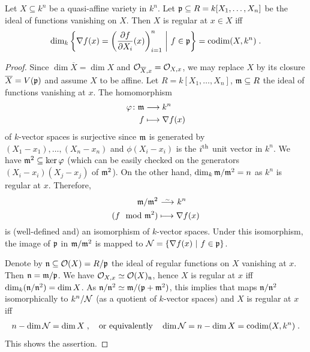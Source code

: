 \documentclass[a4paper,parskip=half,numbers=enddot, DIV=12]{scrreprt}
\begin{document}
\begin{prop}
    Let $X\subseteq k^n$ be  a quasi-affine variety in $k^n$. Let $\mathfrak{p}\subseteq R=k[X_1,\ldots,X_n]$ be the ideal of functions vanishing on $X$. Then $X$ is regular at $x\in X$ iff 
    \begin{align*}
        \dim_k \left\{\nabla f(x) = \left(\frac{\partial f}{\partial X_i}(x)\right)_{i=1}^n \ \middle|\  f\in \mathfrak{p}\right\} = \operatorname{codim}(X,k^n)\;.
    \end{align*}
\end{prop}
\begin{proof}
    Since $\dim \overline{X} = \dim X$ and $\mathcal{O}_{\overline{X},x} = \mathcal{O}_{X,x}$, we may replace $X$ by its closure $\overline{X}=V(\mathfrak{p})$ and assume $X$ to be affine. Let $R=k[X_1,\ldots,X_n]$, $\mathfrak{m}\subseteq R$ the ideal of functions vanishing at $x$. The homomorphism
    \begin{align*}
    	\phi\colon\mm&\morphism k^n\\
    	f&\longmapsto\nabla f(x)
    \end{align*}
    of $k$-vector spaces is surjective since $\mathfrak{m}$ is generated by $(X_1-x_1),\ldots,(X_n-x_n)$ and $\phi(X_i-x_i)$ is the $i^{\text{th}}$ unit vector in $k^n$. We have $\mathfrak{m}^2\subseteq\ker\varphi$ (which can be easily checked on the generators $(X_i-x_i)(X_j-x_j)$ of $\mathfrak{m}^2$). On the other hand, $\dim_k\mathfrak{m}/\mathfrak{m}^2=n$ as $k^n$ is regular at $x$. Therefore,
    \begin{align}\lbl{eq:modToNabla}
	    \begin{split}
		    \mm/\mm^2 &\isomorphism k^n\\
		    (f\mod \mm^2)&\longmapsto \nabla f(x)
	    \end{split}
    \end{align}
    is (well-defined and) an isomorphism of $k$-vector spaces. Under this isomorphism, the image of $\mathfrak{p}$ in $\mathfrak{m}/\mathfrak{m}^2$ is mapped to $\mathcal{N}=\left\{\nabla f(x) \ \middle|\  f\in \mathfrak{p}\right\}$.
    
     Denote by $\mathfrak{n}\subseteq \mathcal{O}(X)=R/\mathfrak{p}$ the ideal of regular functions on $X$ vanishing at $x$. Then $\mathfrak{n} = \mathfrak{m}/\mathfrak{p}$. We have $\mathcal{O}_{X,x} \simeq \mathcal{O}(X)_{\mathfrak{n}}$, hence $X$ is regular at $x$ iff $\dim_k(\mathfrak{n}/\mathfrak{n}^2) = \dim X$. As $\mathfrak{n}/\mathfrak{n}^2\simeq \mathfrak{m}/(\mathfrak{p}+\mathfrak{m}^2)$, this implies that  maps $\mathfrak{n}/\mathfrak{n}^2$ isomorphically to $k^n/\mathcal{N}$ (as a quotient of $k$-vector spaces) and $X$ is regular at $x$ iff 
     \begin{align*}
     	n-\dim\mathcal{N} = \dim X\;,\quad\text{or equivalently}\quad\dim \mathcal{N} =n-\dim X = \operatorname{codim}(X,k^n)\;.
     \end{align*}
     This shows the assertion.
\end{proof}
\end{document}
